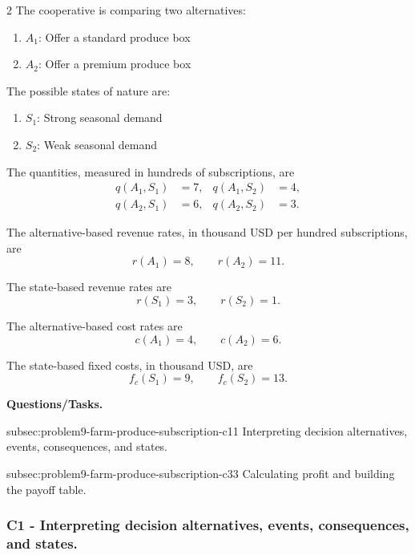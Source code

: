 \begin{multicols}{2}
	The cooperative is comparing two alternatives:
	\begin{enumerate}[label=\arabic*.]
		\item \(A_1\): Offer a standard produce box
		\item \(A_2\): Offer a premium produce box
	\end{enumerate}
	
	The possible states of nature are:
	\begin{enumerate}[label=\arabic*.]
		\item \(S_1\): Strong seasonal demand
		\item \(S_2\): Weak seasonal demand
	\end{enumerate}
	
	\columnbreak
	
	The quantities, measured in hundreds of subscriptions, are
	\[
	\begin{aligned}
		q(A_1,S_1)&=7,
		&
		q(A_1,S_2)&=4,
		\\
		q(A_2,S_1)&=6,
		&
		q(A_2,S_2)&=3.
	\end{aligned}
	\]
	
	The alternative-based revenue rates, in thousand USD per hundred
	subscriptions, are
	\[
	r(A_1)=8,
	\qquad
	r(A_2)=11.
	\]
	
	The state-based revenue rates are
	\[
	r(S_1)=3,
	\qquad
	r(S_2)=1.
	\]
	
	The alternative-based cost rates are
	\[
	c(A_1)=4,
	\qquad
	c(A_2)=6.
	\]
	
	The state-based fixed costs, in thousand USD, are
	\[
	f_c(S_1)=9,
	\qquad
	f_c(S_2)=13.
	\]
\end{multicols}

\textbf{Questions/Tasks.}
\begin{enumerate}
	\CriterionTask
	{subsec:problem9-farm-produce-subscription-c1}{1}
	{Interpreting decision alternatives, events, consequences, and states.}

	\CriterionTask
	{subsec:problem9-farm-produce-subscription-c3}{3}
	{Calculating profit and building the payoff table.}
\end{enumerate}

\subsubsection*{C1 - Interpreting decision alternatives, events, consequences, and states.}
\label{subsec:problem9-farm-produce-subscription-c1}

